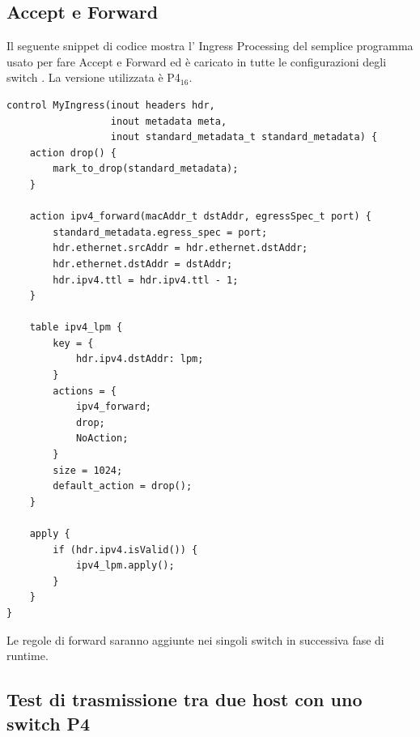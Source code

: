 \subsection*{Accept e Forward}
Il seguente snippet di codice mostra l' Ingress Processing del semplice programma usato per fare Accept e Forward ed è caricato in tutte le configurazioni degli switch \cite{noauthor_p4_2022-1}. La versione utilizzata è P4$_{\mbox{16}}$.
\begin{verbatim}
control MyIngress(inout headers hdr,
                  inout metadata meta,
                  inout standard_metadata_t standard_metadata) {
    action drop() {
        mark_to_drop(standard_metadata);
    }

    action ipv4_forward(macAddr_t dstAddr, egressSpec_t port) {
        standard_metadata.egress_spec = port;
        hdr.ethernet.srcAddr = hdr.ethernet.dstAddr;
        hdr.ethernet.dstAddr = dstAddr;
        hdr.ipv4.ttl = hdr.ipv4.ttl - 1;
    }

    table ipv4_lpm {
        key = {
            hdr.ipv4.dstAddr: lpm;
        }
        actions = {
            ipv4_forward;
            drop;
            NoAction;
        }
        size = 1024;
        default_action = drop();
    }

    apply {
        if (hdr.ipv4.isValid()) {
            ipv4_lpm.apply();
        }
    }
}
\end{verbatim}
Le regole di forward saranno aggiunte nei singoli switch in successiva fase di runtime.
\pagebreak

\subsection*{Test di trasmissione tra due host con uno switch P4}

